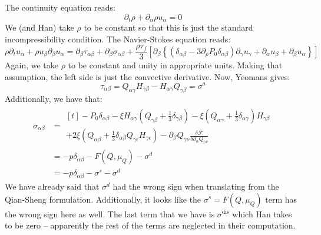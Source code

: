 \documentclass[reqno]{article}
\newcommand\dis{\text{dis}}
\begin{document}
The continuity equation reads:
\begin{equation}
  \partial_t \rho + \partial_\alpha \rho u_\alpha = 0
\end{equation}
We (and Han) take $\rho$ to be constant so that this is just the standard
incompressibility condition.
The Navier-Stokes equation reads:
\begin{equation}
  \rho \partial_t u_\alpha
  + \rho u_\beta \partial_\beta u_\alpha
  = \partial_\beta \tau_{\alpha \beta}
  + \partial_\beta \sigma_{\alpha \beta}
  + \frac{\rho \tau_f}{3} \left[
    \partial_\beta \left\{
      (\delta_{\alpha \beta} - 3\partial_\rho P_0 \delta_{\alpha \beta}) \partial_\gamma u_\gamma
    + \partial_\alpha u_\beta + \partial_\beta u_\alpha \right\}\right]
\end{equation}
Again, we take $\rho$ to be constant and unity in appropriate units.
Making that assumption, the left side is just the convective derivative.
Now, Yeomans gives:
\begin{equation}
  \tau_{\alpha \beta}
  = Q_{\alpha \gamma} H_{\gamma \beta}
  - H_{\alpha \gamma} Q_{\gamma \beta}
  = \sigma^a
\end{equation}
Additionally, we have that:
\begin{equation}
\begin{split}
  \sigma_{\alpha \beta}
  &=
  \begin{multlined}[t]
  - P_0 \delta_{\alpha \beta}
  - \xi H_{\alpha \gamma}
  \left( Q_{\gamma \beta} + \frac13 \delta_{\gamma \beta} \right)
  - \xi \left( Q_{\alpha \gamma} + \frac13 \delta_{\alpha \gamma} \right) 
  H_{\gamma \beta} \\
  + 2 \xi \left( Q_{\alpha \beta} + \frac13 \delta_{\alpha \beta} Q_{\gamma \epsilon} H_{\gamma \epsilon} \right) 
  - \partial_\beta Q_{\gamma \nu} \frac{\delta \mathcal{F}}{\delta \partial_\alpha Q_{\gamma \nu}}
  \end{multlined} \\
  &=
  - p \delta_{\alpha \beta}
  - F(Q, \mu_Q)
  - \sigma^d \\
  &= 
  - p \delta_{\alpha \beta}
  - \sigma^s
  - \sigma^d
\end{split}
\end{equation}
We have already said that $\sigma^d$ had the wrong sign when translating from
the Qian-Sheng formulation.
Additionally, it looks like the $\sigma^s = F(Q, \mu_Q)$ term has the wrong sign
here as well.
The last term that we have is $\sigma^\dis$ which Han takes to be zero --
apparently the rest of the terms are neglected in their computation.
	
\end{document}
